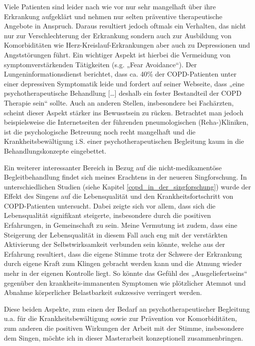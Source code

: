 Viele Patienten sind leider nach wie vor nur sehr mangelhaft über ihre Erkrankung aufgeklärt und nehmen nur selten präventive therapeutische Angebote in Anspruch. Daraus resultiert jedoch oftmals ein Verhalten, das nicht nur zur Verschlechterung der Erkrankung sondern auch zur Ausbildung von Komorbiditäten wie Herz-Kreislauf-Erkrankungen aber auch zu Depressionen und Angststörungen führt. Ein wichtiger Aspekt ist hierbei die Vermeidung von symptomverstärkenden Tätigkeiten (s.g. „Fear Avoidance“). Der Lungeninformationsdienst  berichtet, dass ca. 40\% der COPD-Patienten unter einer depressiven Symptomatik leide und fordert auf seiner Webseite, dass „eine psychotherapeutische Behandlung […] deshalb ein fester Bestandteil der COPD Therapie sein“ sollte. Auch an anderen Stellen, insbesondere bei Fachärzten, scheint dieser Aspekt stärker ins Bewusstsein zu rücken. Betrachtet man jedoch beispielsweise die Internetseiten der führenden pneumologischen (Reha-)Kliniken, ist die psychologische Betreuung noch recht mangelhaft und die Krankheitsbewältigung i.S. einer psychotherapeutischen Begleitung kaum in die Behandlungskonzepte eingebettet. 

Ein weiterer interessanter Bereich in Bezug auf die nicht-medikamentöse Begleitbehandlung findet sich meines Erachtens in der neueren Singforschung. In unterschiedlichen Studien (siehe Kapitel \ref{copd_in_der_singforschung}) wurde der Effekt des Singens auf die Lebensqualität und den Krankheitsfortschritt von COPD-Patienten untersucht. Dabei zeigte sich vor allem, dass sich die Lebensqualität signifikant steigerte, insbesondere durch die positiven Erfahrungen, in Gemeinschaft zu sein. Meine Vermutung ist zudem, dass eine Steigerung der Lebensqualität in diesem Fall auch eng mit der verstärkten Aktivierung der Selbstwirksamkeit verbunden sein könnte, welche aus der Erfahrung resultiert, dass die eigene Stimme trotz der Schwere der Erkrankung durch eigene Kraft zum Klingen gebracht werden kann und die Atmung wieder mehr in der eigenen Kontrolle liegt. So könnte das Gefühl des „Ausgeliefertseins“ gegenüber den krankheits-immanenten Symptomen wie plötzlicher Atemnot und Abnahme körperlicher Belastbarkeit  sukzessive verringert werden.

Diese beiden Aspekte, zum einen der Bedarf an psychotherapeutischer Begleitung u.a. für die Krankheitsbewältigung sowie zur Prävention vor Komorbiditäten, zum anderen die positiven Wirkungen der Arbeit mit der Stimme, insbesondere dem Singen, möchte ich in dieser Masterarbeit konzeptionell zusammenbringen.


